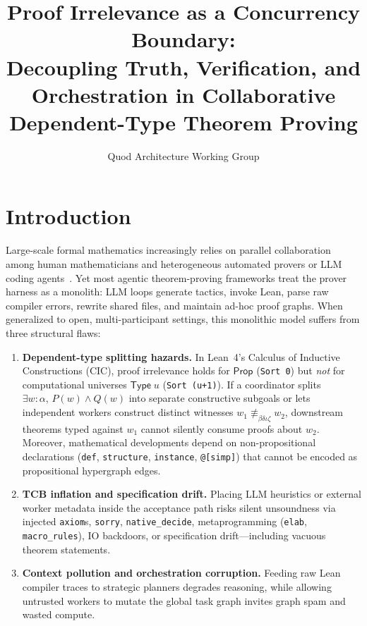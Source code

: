 \documentclass[sigplan,nonacm,10pt]{acmart}
\title{Proof Irrelevance as a Concurrency Boundary:\\
Decoupling Truth, Verification, and Orchestration in Collaborative Dependent-Type Theorem Proving}
\author{Quod Architecture Working Group}
\affiliation{
  \institution{Quod Project}
  \country{}
}
\newcommand{\Prop}{\mathsf{Prop}}
\newcommand{\TypeU}{\mathsf{Type}\;u}
\newcommand{\DefEq}{\equiv_{\beta\delta\iota\zeta}}
\newcommand{\code}[1]{\texttt{#1}}
\begin{document}
\maketitle

\section{Introduction}\label{sec:intro}

Large-scale formal mathematics increasingly relies on parallel collaboration among human mathematicians and heterogeneous automated provers or LLM coding agents~\cite{demoura2021lean4,mathlib2020}. Yet most agentic theorem-proving frameworks treat the prover harness as a monolith: LLM loops generate tactics, invoke Lean, parse raw compiler errors, rewrite shared files, and maintain ad-hoc proof graphs. When generalized to open, multi-participant settings, this monolithic model suffers from three structural flaws:

\begin{enumerate}
  \item \textbf{Dependent-type splitting hazards.} In Lean~4's Calculus of Inductive Constructions (CIC), proof irrelevance holds for $\Prop$ (\code{Sort 0}) but \emph{not} for computational universes $\TypeU$ (\code{Sort (u+1)}). If a coordinator splits $\exists w : \alpha,\, P(w) \land Q(w)$ into separate constructive subgoals or lets independent workers construct distinct witnesses $w_1 \not\DefEq w_2$, downstream theorems typed against $w_1$ cannot silently consume proofs about $w_2$. Moreover, mathematical developments depend on non-propositional declarations (\code{def}, \code{structure}, \code{instance}, \code{@[simp]}) that cannot be encoded as propositional hypergraph edges.
  \item \textbf{TCB inflation and specification drift.} Placing LLM heuristics or external worker metadata inside the acceptance path risks silent unsoundness via injected \code{axiom}s, \code{sorry}, \code{native\_decide}, metaprogramming (\code{elab}, \code{macro\_rules}), IO backdoors, or specification drift---including vacuous theorem statements.
  \item \textbf{Context pollution and orchestration corruption.} Feeding raw Lean compiler traces to strategic planners degrades reasoning, while allowing untrusted workers to mutate the global task graph invites graph spam and wasted compute.
\end{enumerate}
\end{document}
